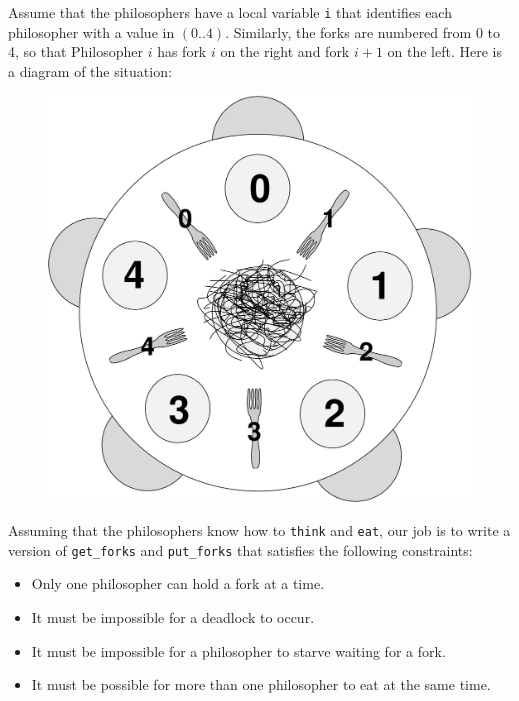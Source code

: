 Assume that the philosophers have a local variable {\tt i} that
identifies each philosopher with a value in $(0..4)$.  Similarly,
the forks are numbered from 0 to 4, so that Philosopher $i$ has
fork $i$ on the right and fork $i+1$ on
the left.  Here is a diagram of the situation:

\begin{figure}[!ht]
    \centering
    \includegraphics[scale=0.20]{table}
\end{figure}

Assuming that the philosophers know how to {\tt think} and {\tt eat},
our job is to write a version of {\tt get\_forks} and {\tt put\_forks}
that satisfies the following constraints:

\begin{itemize}

\item Only one philosopher can hold a fork at a time.

\item It must be impossible for a deadlock to occur.

\item It must be impossible for a philosopher to starve waiting
for a fork.

\item It must be possible for more than one philosopher
to eat at the same time.

\end{itemize}

